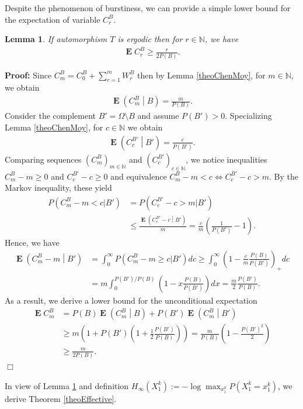 \documentclass[a4paper,12pt]{article}
\newcommand{\okra}[1]{\left( #1 \right)}
\DeclareMathOperator{\mean}{\mathbf{E}}
\newtheorem{lemma}{Lemma}
\newenvironment*{proof}{\begin{trivlist}\item[]
\noindent\textbf{Proof:}}{$\Box$\par\end{trivlist}}
\begin{document}
Despite the phenomenon of burstiness, we can provide a simple lower
bound for the expectation of variable $C^B_r$.
\begin{lemma}
  \label{theoUnconditional}
  If automorphism $T$ is ergodic then for $r\in\mathbb{N}$, we have
  \begin{align}
    \mean C^B_r
    \ge
    \frac{r}{2P(B)}.
  \end{align}
\end{lemma}
\begin{proof}
  Since $C^B_m=C^B_0+\sum_{r=1}^m W^B_r$ then by Lemma
  \ref{theoChenMoy}, for $m\in\mathbb{N}$, we obtain
\begin{align}
  \mean\okra{C^B_m\middle|B}
    =
    \frac{m}{P(B)}.
\end{align}
Consider the complement $B'=\Omega\setminus B$ and assume $P(B')>0$.
Specializing Lemma \ref{theoChenMoy}, for $c\in\mathbb{N}$ we obtain
\begin{align}
  \mean\okra{C^{B'}_c\middle|B'}
    =
    \frac{c}{P(B')}.
\end{align}
Comparing sequences $(C^B_m)_{m\in\mathbb{N}}$ and
$(C^{B'}_c)_{c\in\mathbb{N}}$, we notice inequalities $C^B_m-m\ge 0$ and
$C^{B'}_c-c\ge 0$ and equivalence $C^B_m-m<c \iff C^{B'}_c-c>m$. By the
Markov inequality, these yield
\begin{align}
  P(C^B_m-m<c|B')
  &= P(C^{B'}_c-c>m|B')
    \nonumber\\
  &\le \frac{\mean\okra{C^{B'}_c-c\middle|B'}}{m}
    = \frac{c}{m}\okra{\frac{1}{P(B')}-1}.
\end{align}
Hence, we have
\begin{align}
  \mean\okra{C^B_m-m\middle|B'}
  &=
  \int_0^\infty P(C^B_m-m\ge c|B')dc
  \ge
    \int_0^\infty \okra{1-\frac{c}{m}\frac{P(B)}{P(B')}}_+dc
    \nonumber\\
  &=
  m\int_0^{P(B')/P(B)}\okra{1-x\frac{P(B)}{P(B')}}dx
  =
  \frac{m}{2}\frac{P(B')}{P(B)}.
\end{align}
As a result, we derive a lower bound for the unconditional expectation
\begin{align}
  \mean C^B_m
  &=
    P(B)\mean\okra{C^B_m\middle|B}+P(B')\mean\okra{C^B_m\middle|B'}
    \nonumber\\
  &\ge
    m\okra{1+P(B')\okra{1+\frac{1}{2}\frac{P(B')}{P(B)}}}
    =
    \frac{m}{P(B)}\okra{1-\frac{P(B')^2}{2}}
    \nonumber\\
  &\ge
    \frac{m}{2P(B)}.
\end{align}
\end{proof}
In view of Lemma \ref{theoUnconditional} and definition
$H_\infty(X_1^k):=-\log \max_{x_1^k} P(X_1^k=x_1^k)$, we derive
Theorem \ref{theoEffective}.
\end{document}
